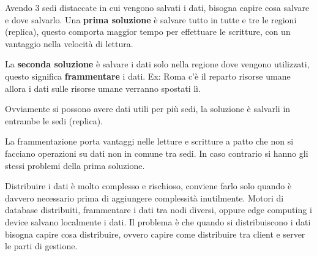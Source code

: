 Avendo $3$ sedi distaccate in cui vengono salvati i dati, bisogna capire cosa salvare
e dove salvarlo.
Una \textbf{prima soluzione} è salvare tutto in tutte e tre le regioni (replica), questo comporta
maggior tempo per effettuare le scritture, con un vantaggio nella velocità di lettura.

La \textbf{seconda soluzione} è salvare i dati solo nella regione dove vengono utilizzati,
questo significa \textbf{frammentare} i dati. Ex: Roma c'è il
reparto risorse umane allora i dati sulle risorse umane verranno spostati lì.

Ovviamente si possono avere dati utili per più sedi, la soluzione è salvarli in
entrambe le sedi (replica).

\begin{nota}
    La frammentazione porta vantaggi nelle letture e scritture a patto che non
    si facciano operazioni su dati non in comune tra sedi. In caso contrario si
    hanno gli stessi problemi della prima soluzione.
\end{nota}

\begin{nota}
    Distribuire i dati è molto complesso e rischioso, conviene farlo solo quando è davvero
    necessario prima di aggiungere complessità inutilmente. Motori di database
    distribuiti, frammentare i dati tra nodi diversi, oppure edge computing i device
    salvano localmente i dati. Il problema è che quando si distribuiscono i dati
    bisogna capire cosa distribuire, ovvero capire come distribuire tra client e
    server le parti di gestione.
\end{nota}
